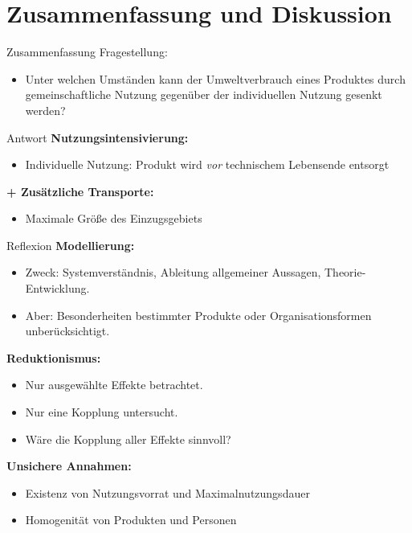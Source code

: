 \documentclass[beamer, xcolor={table,usenames,dvipsnames}]{beamer}
\begin{document}
    \section{Zusammenfassung und Diskussion}
	\begin{frame}{Zusammenfassung}
		\pause
		Fragestellung:
		\begin{itemize}
			\item Unter welchen Umständen kann der Umweltverbrauch eines Produktes durch gemeinschaftliche Nutzung gegenüber der individuellen Nutzung gesenkt werden?
		\end{itemize}
		\pause
		\begin{block}{Antwort}
			\textbf{Nutzungsintensivierung:}
			\begin{itemize}
				\item Individuelle Nutzung: Produkt wird \emph{vor} technischem Lebensende entsorgt  
			\end{itemize}
			\pause
			\textbf{+ Zusätzliche Transporte:}
			\begin{itemize}
				\item Maximale Größe des Einzugsgebiets
			\end{itemize}
		\end{block}
	\end{frame}
	\begin{frame}{Reflexion}
			\pause
			\textbf{Modellierung:}
			\begin{itemize}
				\item Zweck: Systemverständnis, Ableitung allgemeiner Aussagen, Theorie-Entwicklung.
				\item Aber: Besonderheiten bestimmter Produkte oder Organisationsformen unberücksichtigt. 	
			\end{itemize}
			\pause
			\textbf{Reduktionismus:}
			\begin{itemize}
			\item Nur ausgewählte Effekte betrachtet.
			\item Nur eine Kopplung untersucht.
			\item Wäre die Kopplung aller Effekte sinnvoll?	
			\end{itemize}
			\pause
			\textbf{Unsichere Annahmen:}
			\begin{itemize}
				\item Existenz von Nutzungsvorrat und Maximalnutzungsdauer
				\item Homogenität von Produkten und Personen
			\end{itemize}
			
	\end{frame}
\end{document}
